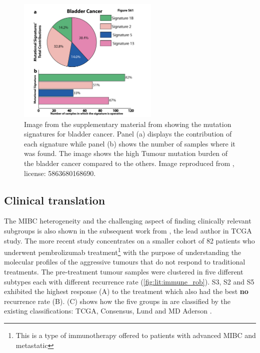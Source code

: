 \begin{figure}[!htb]    
    \centering
    \includegraphics[width=0.6\textwidth,height=0.6\textheight,keepaspectratio]{Sections/Lit_review/Resources/bladder_mut_sig.png}
    \caption[Bladder mutational signature]{Image from the supplementary material from \citeauthor{Alexandrov2013-gi} showing the mutation signatures for bladder cancer. Panel (a) displays the contribution of each signature while panel (b) shows the number of samples where it was found. The image shows the high Tumour mutation burden of the bladder cancer compared to the others. Image reproduced from \citep{Alexandrov2013-gi}, license: 5863680168690. }
    \label{fig:lit:bladder_mut_sig}
\end{figure}



\subsection{Clinical translation} \label{s:lit:clinical}


The MIBC heterogeneity and the challenging aspect of finding clinically relevant subgroups is also shown in the subsequent work from \citeauthor{Robertson2023-na}, the lead author in TCGA study. The more recent study concentrates on a smaller cohort of 82 patients who underwent pembrolizumab treatment\footnote{This is a type of immunotherapy offered to patients with advanced MIBC and metastatic} with the purpose of understanding the molecular profiles of the aggressive tumours that do not respond to traditional treatments. The pre-treatment tumour samples were clustered in five different subtypes each with different recurrence rate (\cref{fig:lit:immune_rob}). S3, S2 and S5 exhibited the highest response (A) to the treatment which also had the best \textbf{no} recurrence rate (B).  (C) shows how the five groups in \cite{Robertson2023-na} are classified by the existing classifications: TCGA, Consensus, Lund and MD Aderson \citep{Robertson2017-mg,Kamoun2020-tj,Marzouka2018-ge,Dadhania2016-cb}. 

